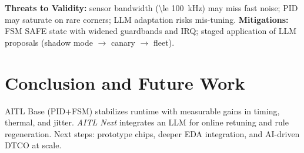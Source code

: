 \documentclass[conference]{IEEEtran}
\begin{document}
\textbf{Threats to Validity:} sensor bandwidth (\SI{\le 100}{kHz}) may miss fast noise; PID may saturate on rare corners; LLM adaptation risks mis-tuning. \textbf{Mitigations:} FSM SAFE state with widened guardbands and IRQ; staged application of LLM proposals (shadow mode $\rightarrow$ canary $\rightarrow$ fleet).

\section{Conclusion and Future Work}
AITL Base (PID+FSM) stabilizes runtime with measurable gains in timing, thermal, and jitter. \emph{AITL Next} integrates an LLM for online retuning and rule regeneration. Next steps: prototype chips, deeper EDA integration, and AI-driven DTCO at scale.

\end{document}
